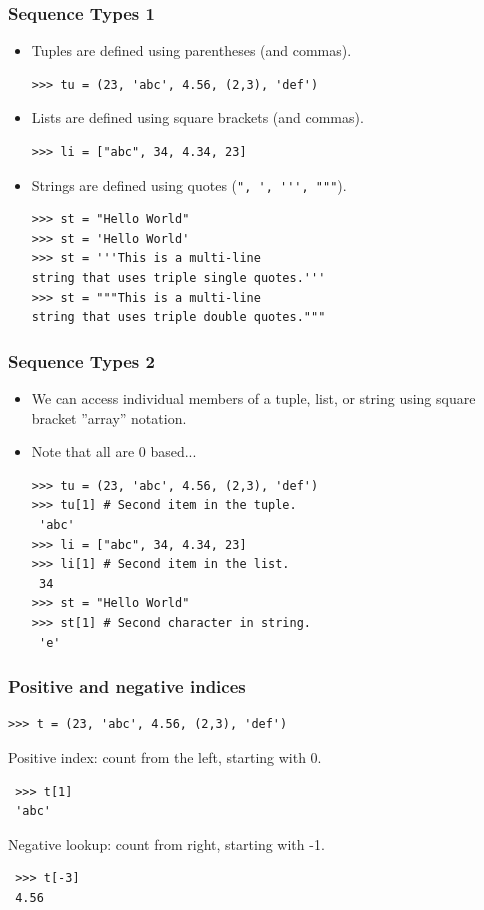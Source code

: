 \documentclass[12pt,handout]{beamer}
\newcommand{\code}[1]{\lstinline{#1}}
\begin{document}
\begin{frame}[fragile]
\frametitle{Sequence Types 1}
\begin{itemize}
\item Tuples are defined using parentheses (and commas).
\small{
\begin{verbatim}
>>> tu = (23, 'abc', 4.56, (2,3), 'def')
\end{verbatim}
}
\item Lists are defined using square brackets (and commas).
\small{
\begin{verbatim}
>>> li = ["abc", 34, 4.34, 23]
\end{verbatim}
}
\item Strings are defined using quotes (\code{", ', ''', """}).
\small{
\begin{verbatim}
>>> st = "Hello World"
>>> st = 'Hello World'
>>> st = '''This is a multi-line
string that uses triple single quotes.'''
>>> st = """This is a multi-line
string that uses triple double quotes."""
\end{verbatim}
}
\end{itemize}
\end{frame}


\begin{frame}[fragile]
\frametitle{Sequence Types 2}
\begin{itemize}
\item We can access individual members of a tuple, list, or string
  using square bracket ''array'' notation.
\item Note that all are 0 based...
\small{
\begin{verbatim}
>>> tu = (23, 'abc', 4.56, (2,3), 'def')
>>> tu[1] # Second item in the tuple.
 'abc'
>>> li = ["abc", 34, 4.34, 23]
>>> li[1] # Second item in the list.
 34
>>> st = "Hello World"
>>> st[1] # Second character in string.
 'e'
\end{verbatim}
}
\end{itemize}
\end{frame}


\begin{frame}[fragile]
\frametitle{Positive and negative indices}
\small{
\begin{verbatim}
>>> t = (23, 'abc', 4.56, (2,3), 'def')
\end{verbatim}
}
Positive index: count from the left, starting with 0.
\small{
\begin{verbatim}
 >>> t[1]
 'abc'
\end{verbatim}
}
Negative lookup: count from right, starting with -1.
\small{
\begin{verbatim}
 >>> t[-3]
 4.56
\end{verbatim}
}
\end{frame}
\end{document}
